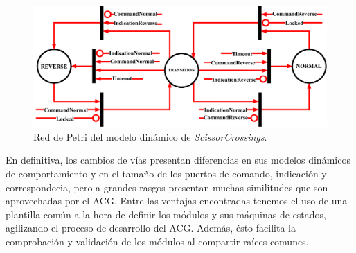 	\begin{figure}[H]
		\centering
		\includegraphics[width=1\textwidth]{Figuras/SSW_Petri}
		\centering\caption{Red de Petri del modelo dinámico de \textit{ScissorCrossings}.}
		\label{fig:SCR_Petri}
	\end{figure}
	
	En definitiva, los cambios de vías presentan diferencias en sus modelos dinámicos de comportamiento y en el tamaño de los puertos de comando, indicación y correspondecia, pero a grandes rasgos presentan muchas similitudes que son aprovechadas por el ACG. Entre las ventajas encontradas tenemos el uso de una plantilla común a la hora de definir los módulos y sus máquinas de estados, agilizando el proceso de desarrollo del ACG. Además, ésto facilita la comprobación y validación de los módulos al compartir raíces comunes.
